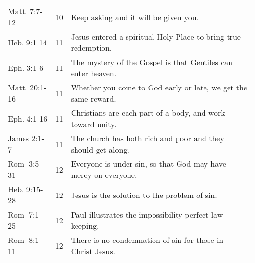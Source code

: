 \begin{table}[h]
\begin{tabular}{lrp{11cm}}
Matt. 7:7-12    & 10 & Keep asking and it will be given you.\\
Heb. 9:1-14     & 11 & Jesus entered a spiritual Holy Place to bring true redemption.\\
Eph. 3:1-6      & 11 & The mystery of the Gospel is that Gentiles can enter heaven.\\
Matt. 20:1-16   & 11 & Whether you come to God early or late, we get the same reward.\\
Eph. 4:1-16     & 11 & Christians are each part of a body, and work toward unity.\\
James 2:1-7     & 11 & The church has both rich and poor and they should get along.\\
Rom. 3:5-31     & 12 & Everyone is under sin, so that God may have mercy on everyone.\\
Heb. 9:15-28    & 12 & Jesus is the solution to the problem of sin.\\
Rom. 7:1-25     & 12 & Paul illustrates the impossibility perfect law keeping.\\
Rom. 8:1-11     & 12 & There is no condemnation of sin for those in Christ Jesus.\\
\bottomrule
\end{tabular}
\label{tab:ScriptureReference}
\end{table}
